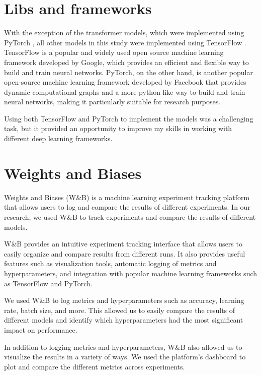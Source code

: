 \section{Libs and frameworks}

With the exception of the transformer models, which were implemented using PyTorch \cite{NEURIPS2019_9015}, all other models in this study were implemented using TensorFlow \cite{tensorflow2015-whitepaper}.
TensorFlow is a popular and widely used open source machine learning framework developed by Google, which provides an efficient and flexible way to build and train neural networks.
PyTorch, on the other hand, is another popular open-source machine learning framework developed by Facebook that provides dynamic computational graphs and a more python-like way to build and train neural networks, making it particularly suitable for research purposes.

Using both TensorFlow and PyTorch to implement the models was a challenging task, but it provided an opportunity to improve my skills in working with different deep learning frameworks.


\section{Weights and Biases}

Weights and Biases (W\&B) \cite{wandb} is a machine learning experiment tracking platform that allows users to log and compare the results of different experiments. 
In our research, we used W\&B to track experiments and compare the results of different models.

W\&B provides an intuitive experiment tracking interface that allows users to easily organize and compare results from different runs.
It also provides useful features such as visualization tools, automatic logging of metrics and hyperparameters, and integration with popular machine learning frameworks such as TensorFlow and PyTorch.

We used W\&B to log metrics and hyperparameters such as accuracy, learning rate, batch size, and more. 
This allowed us to easily compare the results of different models and identify which hyperparameters had the most significant impact on performance.

In addition to logging metrics and hyperparameters, W\&B also allowed us to visualize the results in a variety of ways. 
We used the platform's dashboard to plot and compare the different metrics across experiments.

